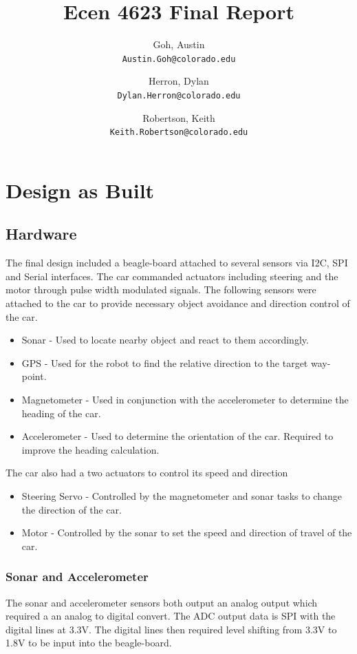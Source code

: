 \documentclass[final,letterpaper,singleside,12pt]{article}
\title{Ecen 4623 Final Report}
\author{
Goh, Austin\\
\texttt{Austin.Goh@colorado.edu}
\and
Herron, Dylan\\
\texttt{Dylan.Herron@colorado.edu}
\and
Robertson, Keith\\
\texttt{Keith.Robertson@colorado.edu}
}
\begin{document}
\maketitle
\pagebreak
\tableofcontents
\pagebreak
\section{Design as Built} %
\label{sec:design_as_built}
\subsection{Hardware} %
\label{sub:hardware}
The final design included a beagle-board attached to several sensors via I2C, SPI and Serial interfaces. The car commanded actuators including steering and the motor through pulse width modulated signals. The following sensors were attached to the car to provide necessary object avoidance and direction control of the car.
\begin{itemize}
	\item Sonar - Used to locate nearby object and react to them accordingly.
	\item GPS - Used for the robot to find the relative direction to the target way-point.
	\item Magnetometer - Used in conjunction with the accelerometer to determine the heading of the car.
	\item Accelerometer - Used to determine the orientation of the car. Required to improve the heading calculation.
\end{itemize}
The car also had a two actuators to control its speed and direction
\begin{itemize}
	\item Steering Servo - Controlled by the magnetometer and sonar tasks to change the direction of the car.
	\item Motor - Controlled by the sonar to set the speed and direction of travel of the car.
\end{itemize}
\subsubsection{Sonar and Accelerometer} %
\label{ssub:sonar}
The sonar and accelerometer sensors both output an analog output which required a an analog to digital convert. The ADC output data is SPI with the digital lines at 3.3V. The digital lines then required level shifting from 3.3V to 1.8V to be input into the beagle-board. 
\end{document}

